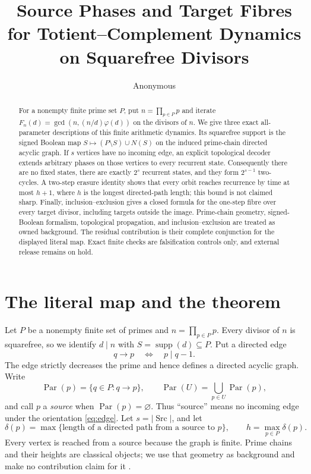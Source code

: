 \documentclass[10pt,a4paper]{amsart}
\title[Totient--complement Pratt dynamics]{Source Phases and Target Fibres for Totient--Complement Dynamics on Squarefree Divisors}
\author{Anonymous}
\date{}
\theoremstyle{definition}
\theoremstyle{remark}
\newcommand{\Par}{\operatorname{Par}}
\newcommand{\Src}{\operatorname{Src}}
\newcommand{\supp}{\operatorname{supp}}
\begin{document}
\begin{abstract}
For a nonempty finite prime set $P$, put $n=\prod_{p\in P}p$ and
iterate $F_n(d)=\gcd(n,(n/d)\varphi(d))$ on the divisors of $n$.
We give three exact all-parameter descriptions of this finite arithmetic
dynamics.  Its squarefree support is the signed Boolean map
$S\mapsto(P\setminus S)\cup N(S)$ on the induced prime-chain directed
acyclic graph.  If $s$ vertices have no incoming edge, an explicit
topological decoder extends arbitrary phases on those vertices to every
recurrent state.  Consequently there are no fixed states, there are exactly
$2^s$ recurrent states, and they form $2^{s-1}$ two-cycles.  A two-step
erasure identity shows that every orbit reaches recurrence by time at most
$h+1$, where $h$ is the longest directed-path length; this bound is not
claimed sharp.  Finally, inclusion--exclusion gives a closed formula for the
one-step fibre over every target divisor, including targets outside the
image.  Prime-chain geometry, signed-Boolean formalism, topological
propagation, and inclusion--exclusion are treated as owned background.  The
residual contribution is their complete conjunction for the displayed
literal map.  Exact finite checks are falsification controls only, and
external release remains on hold.
\end{abstract}

\maketitle

\section{The literal map and the theorem}

Let $P$ be a nonempty finite set of primes and $n=\prod_{p\in P}p$.
Every divisor of $n$ is squarefree, so we identify $d\mid n$ with
$S=\supp(d)\subseteq P$.  Put a directed edge
\begin{equation}\label{eq:edge}
                         q\longrightarrow p\quad\Longleftrightarrow\quad p\mid q-1.
\end{equation}
The edge strictly decreases the prime and hence defines a directed acyclic
graph.  Write
\[
 \Par(p)=\{q\in P:q\to p\},\qquad
 \Par(U)=\bigcup_{p\in U}\Par(p),
\]
and call $p$ a \emph{source} when $\Par(p)=\varnothing$.  Thus ``source''
means no incoming edge under the orientation \eqref{eq:edge}.  Let
$s=|\Src|$, and let
\[
 \delta(p)=\max\{\text{length of a directed path from a source to }p\},
 \qquad h=\max_{p\in P}\delta(p).
\]
Every vertex is reached from a source because the graph is finite.
Prime chains and their heights are classical objects; we use that geometry
as background and make no contribution claim for it
\cite{FordKonyaginLuca2010}.
\end{document}
